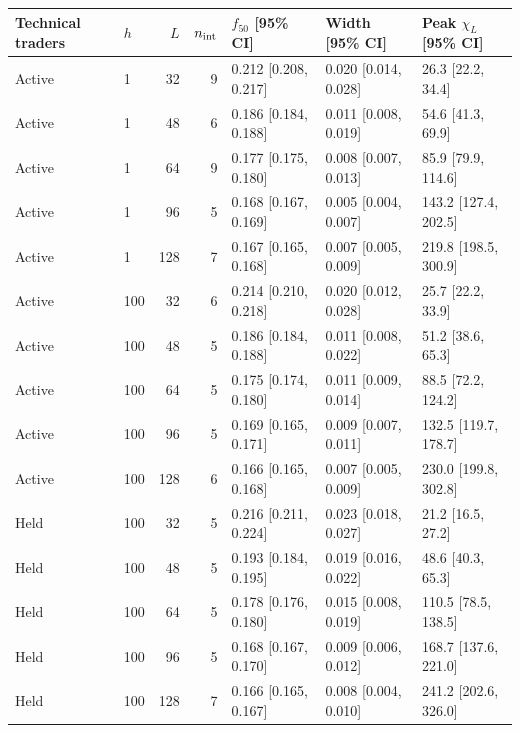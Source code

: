 \begin{center}
\begin{minipage}{\linewidth}\centering
\captionsetup{type=table,hypcap=false}
\caption{Grid-size comparisons over 50 starting markets and 3,000 post-switch steps. Brackets give 95\% confidence intervals (CI) from 2,000 whole-market bootstrap samples. $n_{\rm int}$ counts fractions with $0.05<\hat p<0.95$. Crossings use first upward linear interpolation. Susceptibility maxima are selected over the sampled grid, including reselection in each bootstrap sample. Undefined denotes an unbracketed crossing; intervals use available bracketed samples.}
\label{tab:finite-size-scaling}
\footnotesize\setlength{\tabcolsep}{3pt}
\begin{tabular}{llrrlll}
\toprule
Technical traders & $h$ & $L$ & $n_{\rm int}$ & $f_{50}$ [95\% CI] & Width [95\% CI] & Peak $\chi_L$ [95\% CI] \\
\midrule
Active & 1 & 32 & 9 & 0.212 [0.208, 0.217] & 0.020 [0.014, 0.028] & 26.3 [22.2, 34.4] \\
Active & 1 & 48 & 6 & 0.186 [0.184, 0.188] & 0.011 [0.008, 0.019] & 54.6 [41.3, 69.9] \\
Active & 1 & 64 & 9 & 0.177 [0.175, 0.180] & 0.008 [0.007, 0.013] & 85.9 [79.9, 114.6] \\
Active & 1 & 96 & 5 & 0.168 [0.167, 0.169] & 0.005 [0.004, 0.007] & 143.2 [127.4, 202.5] \\
Active & 1 & 128 & 7 & 0.167 [0.165, 0.168] & 0.007 [0.005, 0.009] & 219.8 [198.5, 300.9] \\
\midrule
Active & 100 & 32 & 6 & 0.214 [0.210, 0.218] & 0.020 [0.012, 0.028] & 25.7 [22.2, 33.9] \\
Active & 100 & 48 & 5 & 0.186 [0.184, 0.188] & 0.011 [0.008, 0.022] & 51.2 [38.6, 65.3] \\
Active & 100 & 64 & 5 & 0.175 [0.174, 0.180] & 0.011 [0.009, 0.014] & 88.5 [72.2, 124.2] \\
Active & 100 & 96 & 5 & 0.169 [0.165, 0.171] & 0.009 [0.007, 0.011] & 132.5 [119.7, 178.7] \\
Active & 100 & 128 & 6 & 0.166 [0.165, 0.168] & 0.007 [0.005, 0.009] & 230.0 [199.8, 302.8] \\
\midrule
Held & 100 & 32 & 5 & 0.216 [0.211, 0.224] & 0.023 [0.018, 0.027] & 21.2 [16.5, 27.2] \\
Held & 100 & 48 & 5 & 0.193 [0.184, 0.195] & 0.019 [0.016, 0.022] & 48.6 [40.3, 65.3] \\
Held & 100 & 64 & 5 & 0.178 [0.176, 0.180] & 0.015 [0.008, 0.019] & 110.5 [78.5, 138.5] \\
Held & 100 & 96 & 5 & 0.168 [0.167, 0.170] & 0.009 [0.006, 0.012] & 168.7 [137.6, 221.0] \\
Held & 100 & 128 & 7 & 0.166 [0.165, 0.167] & 0.008 [0.004, 0.010] & 241.2 [202.6, 326.0] \\
\bottomrule
\end{tabular}
\end{minipage}
\end{center}
